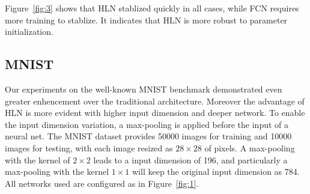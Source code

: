 \documentclass[3p,times,procedia]{elsarticle}
\begin{document}
Figure~\ref{fig:3} shows that HLN
stablized quickly in all cases,
while FCN requires more training
to stablize. It indicates that 
HLN is more robust to parameter
initialization.
\subsection{MNIST}
Our experiments on the well-known MNIST
benchmark demonstrated even
greater enhencement
over the traditional architecture.
Moreover the advantage of HLN is 
more evident
with higher input dimension
and deeper network. 
To enable the input dimension variation,
a max-pooling is applied before the input
of a neural net. The MNIST dataset
provides 50000 images for training and 
10000 images for testing, with each image
resized as $28\times 28$ of pixels. 
A max-pooling with the kernel of 
$2\times 2$
leads to a input dimension of 196, and
particularly a max-pooling with the
kernel $1\times 1$ will keep the original
input dimension as 784. All networks used
are configured as in 
Figure~\ref{fig:1}.
\end{document}
